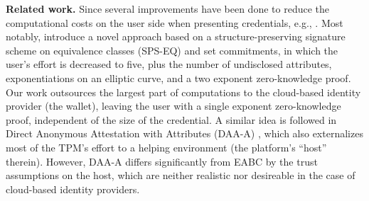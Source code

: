 \documentclass[runningheads]{llncs}
\begin{document}

\ifCANS
\else
\medskip\textbf{Related work.}
%
Since \cite{brands99,idemix} several improvements have been done to reduce the computational costs on the user side when presenting  credentials,  e.g., \cite{Au:2006,Barki:2016,Camenisch:2008,camlys04,DBLP:conf/fc/RingersVH17}.
Most notably, \cite{fuhasl18} introduce a novel approach based on a structure-preserving signature scheme on equivalence classes (SPS-EQ) and set commitments,
in which the user's effort is decreased to five, plus the number of undisclosed attributes, exponentiations on an elliptic curve, and a two exponent zero-knowledge proof.
Our work outsources the largest part of computations to the cloud-based identity provider (the wallet), leaving the user with a single exponent zero-knowledge proof, independent of the size of the credential.
A similar idea is followed in Direct Anonymous Attestation with Attributes (DAA-A) \cite{DAA-A}, which also externalizes most of the TPM's effort to a helping environment (the platform's ``host'' therein).
However, DAA-A differs significantly from EABC by the trust assumptions on the host, which are neither realistic nor desireable in the case of cloud-based identity providers. 
\fi
\end{document}
